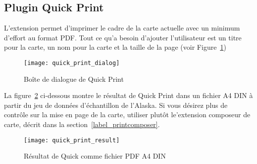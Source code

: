 \subsection{Plugin Quick Print}


L'extension  permet d'imprimer le cadre de
la carte actuelle avec un minimum d'effort au format PDF. Tout ce qu'a besoin
d'ajouter l'utilisateur est un titre pour la carte, un nom pour la carte et la
taille de la page (voir Figure~\ref{fig:quickprint})
 
\begin{figure}[ht]
   \begin{center}
   \caption{Boîte de dialogue de Quick Print
\nixcaption}\label{fig:quickprint}\smallskip
   \texttt{[image: quick\_print\_dialog]}
\end{center}
\end{figure}

La figure~\ref{fig:quickprint_result} ci-dessous montre le résultat de Quick
Print dans un fichier A4 DIN à partir du jeu de données d'échantillon de
l'Alaska. Si vous désirez plus de contrôle sur la mise en page de la carte,
utiliser plutôt le'extension composeur de carte, décrit dans la
section~\ref{label_printcomposer}.

\begin{figure}[ht]
   \begin{center}
   \caption{Résultat de Quick comme fichier PDF A4 DIN
\nixcaption}\label{fig:quickprint_result}\smallskip
   \texttt{[image: quick\_print\_result]}
\end{center}
\end{figure}


